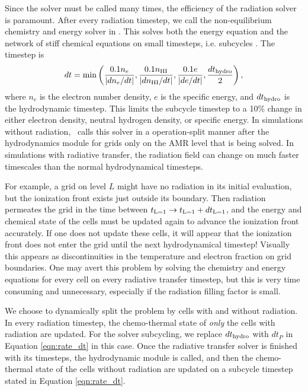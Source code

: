 \documentclass[apj,onecolumn]{emulateapj}
\begin{document}
Since the solver must be called many times, the efficiency of the
radiation solver is paramount.  After every radiation timestep, we
call the non-equilibrium chemistry and energy solver in \enzo.  This
solves both the energy equation and the network of stiff chemical
equations on small timesteps, i.e. subcycles \citep{Anninos97}.  The
timestep is
%
\begin{equation}
  \label{eqn:rate_dt}
  dt = \min\left(
    \frac{0.1n_e}{|dn_e/dt|}, 
    \frac{0.1n_{\rm HI}}{|dn_{\rm HI}/dt|}, 
    \frac{0.1e}{|de/dt|}, 
    \frac{dt_{\rm hydro}}{2}\right),
\end{equation}
where $n_e$ is the electron number density, $e$ is the specific
energy, and $dt_{\rm hydro}$ is the hydrodynamic timestep.  This
limits the subcycle timestep to a 10\% change in either electron
density, neutral hydrogen density, or specific energy.  In simulations
without radiation, \enzo~calls this solver in a operation-split manner
after the hydrodynamics module for grids only on the AMR level that is
being solved.  In simulations with radiative transfer, the radiation
field can change on much faster timescales than the normal
hydrodynamical timesteps.

For example, a grid on level $L$ might have no radiation in its
initial evaluation, but the ionization front exists just outside its
boundary.  Then radiation permeates the grid in the time between
$t_{\rm L=1} \rightarrow t_{\rm L=1}+dt_{\rm L=1}$, and the energy and
chemical state of the cells must be updated again to advance the
ionization front accurately.  If one does not update these cells, it
will appear that the ionization front does not enter the grid until
the next hydrodynamical timestep!  Visually this appears as
discontinuities in the temperature and electron fraction on grid
boundaries.  One may avert this problem by solving the chemistry and
energy equations for every cell on every radiative transfer timestep,
but this is very time consuming and unnecessary, especially if the
radiation filling factor is small.

We choose to dynamically split the problem by cells with and without
radiation.  In every radiation timestep, the chemo-thermal state of
\textit{only} the cells with radiation are updated.  For the solver
subcycling, we replace $dt_{\rm hydro}$ with $dt_P$ in Equation
\ref{eqn:rate_dt} in this case.  Once the radiative transfer solver is
finished with its timesteps, the hydrodynamic module is called, and
then the chemo-thermal state of the cells without radiation are
updated on a subcycle timestep stated in Equation \ref{eqn:rate_dt}.
\end{document}
